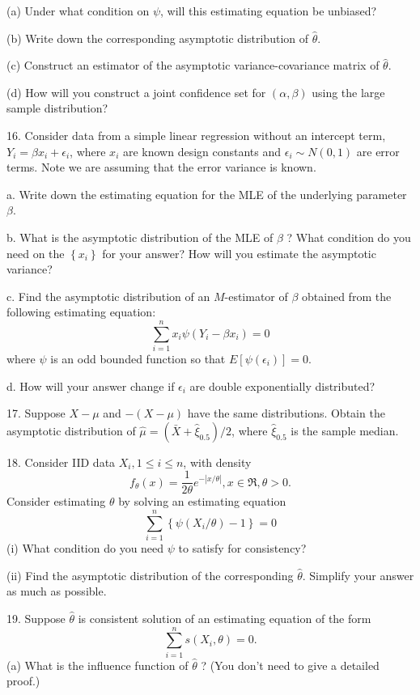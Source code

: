 \documentclass[11pt]{article}
\theoremstyle{definition}
\begin{document}
(a) Under what condition on $\psi$, will this estimating equation be unbiased?

(b) Write down the corresponding asymptotic distribution of $\widehat{\theta}$.

(c) Construct an estimator of the asymptotic variance-covariance matrix of $\widehat{\theta}$.

(d) How will you construct a joint confidence set for $(\alpha, \beta)$ using the large sample distribution?

16. Consider data from a simple linear regression without an intercept term, $Y_i=\beta x_i+\epsilon_i$, where $x_i$ are known design constants and $\epsilon_i \sim N(0,1)$ are error terms. Note we are assuming that the error variance is known.

a. Write down the estimating equation for the MLE of the underlying parameter $\beta$.

b. What is the asymptotic distribution of the MLE of $\beta$ ? What condition do you need on the $\left\{x_i\right\}$ for your answer? How will you estimate the asymptotic variance?

c. Find the asymptotic distribution of an $M$-estimator of $\beta$ obtained from the following estimating equation:
$$
\sum_{i=1}^n x_i \psi\left(Y_i-\beta x_i\right)=0
$$
where $\psi$ is an odd bounded function so that $E\left[\psi\left(\epsilon_i\right)\right]=0$.

d. How will your answer change if $\epsilon_i$ are double exponentially distributed?

17. Suppose $X-\mu$ and $-(X-\mu)$ have the same distributions. Obtain the asymptotic distribution of $\widehat{\mu}=\left(\bar{X}+\widehat{\xi}_{0.5}\right) / 2$, where $\widehat{\xi}_{0.5}$ is the sample median.


18. Consider IID data $X_i, 1 \leq i \leq n$, with density
$$
f_\theta(x)=\frac{1}{2 \theta} e^{-|x / \theta|}, x \in \Re, \theta>0 .
$$
Consider estimating $\theta$ by solving an estimating equation
$$
\sum_{i=1}^n\left\{\psi\left(X_i / \theta\right)-1\right\}=0
$$
(i) What condition do you need $\psi$ to satisfy for consistency? 

(ii) Find the asymptotic distribution of the corresponding $\widehat{\theta}$. Simplify your answer as much as possible.

19. Suppose $\widehat{\theta}$ is consistent solution of an estimating equation of the form
$$
\sum_{i=1}^n s\left(X_i, \theta\right)=0 .
$$
(a) What is the influence function of $\widehat{\theta}$ ? (You don't need to give a detailed proof.)
\end{document}
